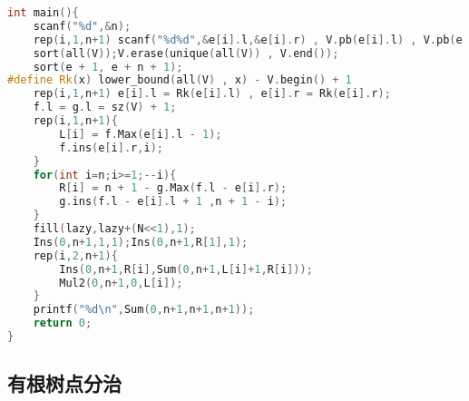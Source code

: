 \begin{lstlisting}[language=C++]
int main(){
    scanf("%d",&n);
    rep(i,1,n+1) scanf("%d%d",&e[i].l,&e[i].r) , V.pb(e[i].l) , V.pb(e[i].r);
    sort(all(V));V.erase(unique(all(V)) , V.end());
    sort(e + 1, e + n + 1);
#define Rk(x) lower_bound(all(V) , x) - V.begin() + 1
    rep(i,1,n+1) e[i].l = Rk(e[i].l) , e[i].r = Rk(e[i].r);
    f.l = g.l = sz(V) + 1;
    rep(i,1,n+1){
        L[i] = f.Max(e[i].l - 1);
        f.ins(e[i].r,i);
    }
    for(int i=n;i>=1;--i){
        R[i] = n + 1 - g.Max(f.l - e[i].r);
        g.ins(f.l - e[i].l + 1 ,n + 1 - i);
    }
    fill(lazy,lazy+(N<<1),1);
    Ins(0,n+1,1,1);Ins(0,n+1,R[1],1);
    rep(i,2,n+1){
        Ins(0,n+1,R[i],Sum(0,n+1,L[i]+1,R[i]));
        Mul2(0,n+1,0,L[i]);
    }
    printf("%d\n",Sum(0,n+1,n+1,n+1));
    return 0;
}
\end{lstlisting}
\subsection{有根树点分治}
